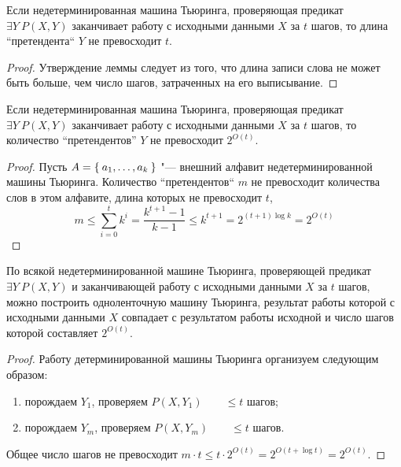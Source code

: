 \begin{lemma}
	Если недетерминированная машина Тьюринга, проверяющая предикат $ \exists Y~P(X, Y) $ заканчивает работу с исходными данными $ X $ за $ t $ шагов, то длина ``претендента`` $ Y $ не превосходит $ t $.
\end{lemma}

\begin{proof}
	Утверждение леммы следует из того, что длина записи слова не может быть больше, чем число шагов, затраченных на его выписывание.
\end{proof}

\begin{lemma}
	Если недетерминированная машина Тьюринга, проверяющая предикат $ \exists Y~P(X, Y) $ заканчивает работу с исходными данными $ X $ за $ t $ шагов, то количество ``претендентов'' $ Y $ не превосходит $ 2^{O(t)} $.
\end{lemma}

\begin{proof}
	Пусть $ A = \Set{a_1, \dots, a_k} $ "--- внешний алфавит недетерминированной машины Тьюринга.
	Количество ``претендентов`` $ m $ не превосходит количества слов в этом алфавите, длина которых не превосходит $ t $, \ie
	$$ m \le \sum_{i = 0}^t k^i = \frac{k^{t + 1} - 1}{k - 1} \le k^{t + 1} = 2^{(t + 1)\log k} = 2^{O(t)} $$
\end{proof}

\begin{theorem}\label{th:n_to_d}
	По всякой недетерминированной машине Тьюринга, проверяющей предикат $ \exists Y~P(X, Y) $ и заканчивающей работу с исходными данными $ X $ за $ t $ шагов, можно построить одноленточную машину Тьюринга, результат работы которой с исходными данными $ X $ совпадает с результатом работы исходной и число шагов которой составляет $ 2^{O(t)} $.
\end{theorem}

\begin{proof}
	Работу детерминированной машины Тьюринга организуем следующим образом:
	\begin{enumerate}
		\item порождаем $ Y_1 $, проверяем $ P(X, Y_1) \qquad \le t $ шагов;
		\item порождаем $ Y_m $, проверяем $ P(X, Y_m) \qquad \le t $ шагов.
	\end{enumerate}
	Общее число шагов не превосходит $ m \cdot t \le t \cdot 2^{O(t)} = 2^{O(t + \log t)} = 2^{O(t)} $.
\end{proof}

